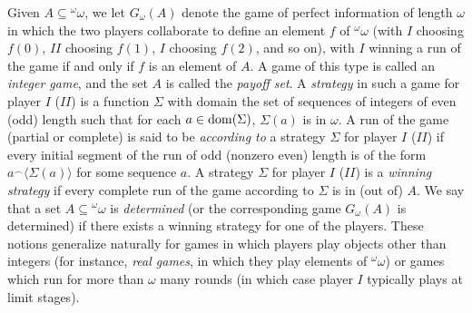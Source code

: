 \documentclass{book}%
\newcommand{\breals}{{^{\omega}}\omega}
\newcommand{\dom}{{\rm dom}}
\begin{document}
Given $A \subseteq\breals$, we let
$G_{\omega}(A)$ denote the game of perfect
information of length $\omega$ in which the two players collaborate to define an element $f$ of $\breals$ (with $I$ choosing
$f(0)$, $II$ choosing $f(1)$, $I$ choosing $f(2)$, and so on),
with $I$ winning a run of the game if and only if $f$ is an element of $A$. A game of this type is called
an \emph{integer game},  and the set $A$ is called the \emph{payoff set}.
A \emph{strategy} in such a game for player $I$ ($II$) is a function
$\Sigma$ with domain the set of sequences of integers of even (odd) length such
that for each $a \in \dom(\Sigma)$, $\Sigma(a)$ is in $\omega$.
A run of the game (partial or complete) is said to be
\emph{according to} a strategy $\Sigma$ for player $I$ ($II$) if every
initial segment of the run of odd (nonzero even) length is of the form
$a^{\frown}\langle \Sigma(a) \rangle$ for some sequence $a$. A
strategy $\Sigma$ for player $I$ ($II$) is a \emph{winning strategy}
if every
complete run of the game according to $\Sigma$ is in (out of) $A$.
We say that a set $A \subseteq{^{\omega}}\omega$ is \emph{determined} (or  the corresponding game
$G_{\omega}(A)$ is determined) if there exists a winning strategy for one of the players. These notions
generalize naturally for games in which players play objects other than integers (for instance, \emph{real games}, in which they play elements of $\breals$) or games which run for more than $\omega$ many rounds (in which case player $I$ typically
plays at limit stages).
\end{document}
